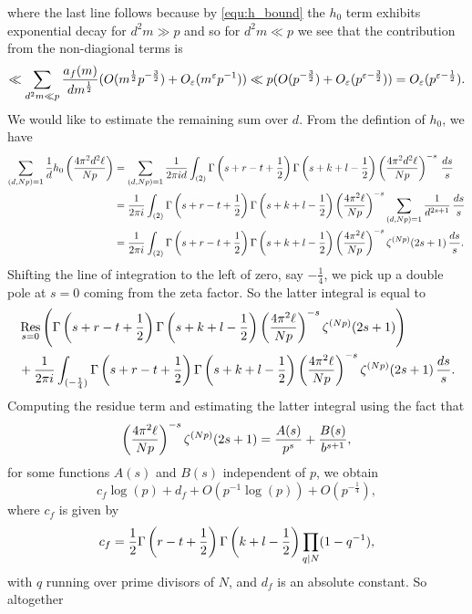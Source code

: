 \documentclass[12pt,reqno,oneside]{amsart}
\begin{document}
    where the last line follows because by \cref{equ:h_bound} the $h_{0}$ term exhibits exponential decay for $d^{2}m \gg p$ and so for $d^{2}m \ll p$ we see that the contribution from the non-diagional terms is
    \[
        \ll \sum_{d^{2}m \ll p}\frac{a_{f}(m)}{dm^{\frac{1}{2}}}(O(m^{\frac{1}{2}}p^{-\frac{3}{2}})+O_{\varepsilon}(m^{\varepsilon}p^{-1})) \ll p(O(p^{-\frac{3}{2}})+O_{\varepsilon}(p^{\varepsilon-\frac{3}{2}})) = O_{\varepsilon}(p^{\varepsilon-\frac{1}{2}}).
    \]
    We would like to estimate the remaining sum over $d$. From the defintion of $h_{0}$, we have
    \begin{align*}
        \sum_{(d,Np) = 1}\frac{1}{d}h_{0}\left(\frac{4\pi^{2}d^{2}\ell}{Np}\right) &= \sum_{(d,Np) = 1}\frac{1}{2\pi id}\int_{(2)}\Gamma\left(s+r-t+\frac{1}{2}\right)\Gamma\left(s+k+l-\frac{1}{2}\right)\left(\frac{4\pi^{2}d^{2}\ell}{Np}\right)^{-s}\,\frac{ds}{s} \\
        &= \frac{1}{2\pi i}\int_{(2)}\Gamma\left(s+r-t+\frac{1}{2}\right)\Gamma\left(s+k+l-\frac{1}{2}\right)\left(\frac{4\pi^{2}\ell}{Np}\right)^{-s}\sum_{(d,Np) = 1}\frac{1}{d^{2s+1}}\,\frac{ds}{s} \\
        &= \frac{1}{2\pi i}\int_{(2)}\Gamma\left(s+r-t+\frac{1}{2}\right)\Gamma\left(s+k+l-\frac{1}{2}\right)\left(\frac{4\pi^{2}\ell}{Np}\right)^{-s}\zeta^{(Np)}(2s+1)\,\frac{ds}{s}.
    \end{align*}
    Shifting the line of integration to the left of zero, say $-\frac{1}{4}$, we pick up a double pole at $s = 0$ coming from the zeta factor. So the latter integral is equal to
    \begin{align*}
        &\operatorname*{\mathrm{Res}}_{s = 0}\left(\Gamma\left(s+r-t+\frac{1}{2}\right)\Gamma\left(s+k+l-\frac{1}{2}\right)\left(\frac{4\pi^{2}\ell}{Np}\right)^{-s}\zeta^{(Np)}(2s+1)\right) \\
        &+ \frac{1}{2\pi i}\int_{(-\frac{1}{4})}\Gamma\left(s+r-t+\frac{1}{2}\right)\Gamma\left(s+k+l-\frac{1}{2}\right)\left(\frac{4\pi^{2}\ell}{Np}\right)^{-s}\zeta^{(Np)}(2s+1)\,\frac{ds}{s}.
    \end{align*}
    Computing the residue term and estimating the latter integral using the fact that
    \[
        \left(\frac{4\pi^{2}\ell}{Np}\right)^{-s}\zeta^{(Np)}(2s+1) = \frac{A(s)}{p^{s}}+\frac{B(s)}{b^{s+1}},
    \]
    for some functions $A(s)$ and $B(s)$ independent of $p$, we obtain
    \[
        c_{f}\log(p)+d_{f}+O(p^{-1}\log(p))+O(p^{-\frac{1}{4}}),
    \]
    where $c_{f}$ is given by
    \[
        c_{f} = \frac{1}{2}\Gamma\left(r-t+\frac{1}{2}\right)\Gamma\left(k+l-\frac{1}{2}\right)\prod_{q \mid N}(1-q^{-1}),
    \]
    with $q$ running over prime divisors of $N$, and $d_{f}$ is an absolute constant. So altogether
\end{document}
